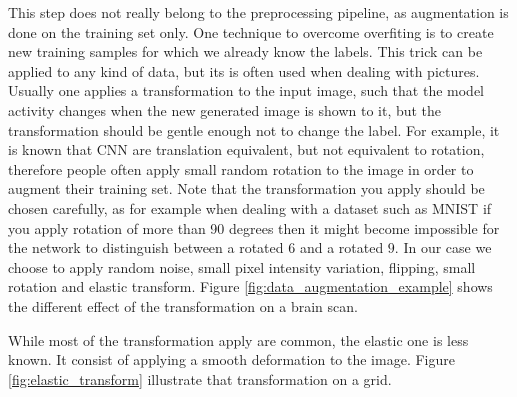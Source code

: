 This step does not really belong to the preprocessing pipeline, as augmentation is done on the training set only. One technique to overcome overfiting is to create new training samples for which we already know the labels. This trick can be applied to any kind of data, but its is often used when dealing with pictures. Usually one applies a transformation to the input image, such that the model activity changes when the new generated image is shown to it, but the transformation should be gentle enough not to change the label. 
For example, it is known that CNN are translation equivalent, but not equivalent to rotation, therefore people often apply small random rotation to the image in order to augment their training set. Note that the transformation you apply should be chosen carefully, as for example when dealing with a dataset such as MNIST if you apply rotation of more than 90 degrees then it might become impossible for the network to distinguish between a rotated $6$ and a rotated $9$. 
In our case we choose to apply random noise, small pixel intensity variation, flipping, small rotation and elastic transform. Figure \ref{fig:data_augmentation_example} shows the different effect of the transformation on a brain scan.

While most of the transformation apply are common, the elastic one is less known. It consist of applying a smooth deformation to the image. Figure \ref{fig:elastic_transform} illustrate that transformation on a grid.


